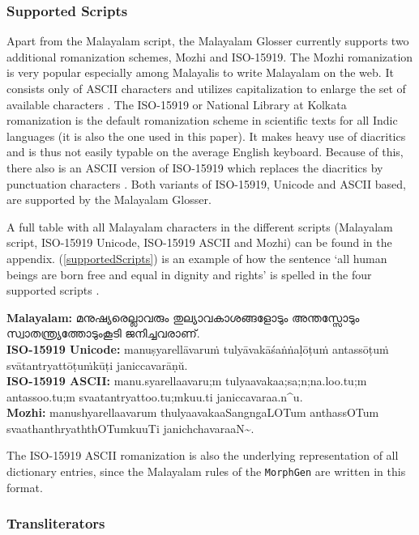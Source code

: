 \documentclass[a4paper]{article}
\newcommand{\typ}[1]{\texttt{#1}}
\begin{document}
\subsubsection{Supported Scripts}\label{scripts}

Apart from the Malayalam script, the Malayalam Glosser currently supports two additional romanization schemes, Mozhi and ISO-15919. The Mozhi romanization is very popular especially among Malayalis to write Malayalam on the web. It consists only of ASCII characters and utilizes capitalization to enlarge the set of available characters \parencite{mozhi}. The ISO-15919 or National Library at Kolkata romanization is the default romanization scheme in scientific texts for all Indic languages (it is also the one used in this paper). It makes heavy use of diacritics and is thus not easily typable on the average English keyboard. Because of this, there also is an ASCII version of ISO-15919 which replaces the diacritics by punctuation characters \parencite{iso-15919}. Both variants of ISO-15919, Unicode and ASCII based, are supported by the Malayalam Glosser.

A full table with all Malayalam characters in the different scripts (Malayalam script, ISO-15919 Unicode, ISO-15919 ASCII and Mozhi) can be found in the appendix. (\ref{supportedScripts}) is an example of how the sentence `all human beings are born free and equal in dignity and rights' is spelled in the four supported scripts \parencite{malOmniglot}.

\ex
\textbf{Malayalam:} മനുഷ്യരെല്ലാവരും തുല്യാവകാശങ്ങളോടും അന്തസ്സോടും സ്വാ\-ത\-ന്ത്ര്യ\-ത്തോ\-ടും\-കൂ\-ടി ജനിച്ചവരാണ്. \\[1ex]
\textbf{ISO-15919 Unicode:} manuṣyarellāvaruṁ tulyāvakāśaṅṅaḷōṭuṁ antassōṭ\-uṁ svātantryattōṭuṁkūṭi janiccavarāṇŭ. \\[1ex]
\textbf{ISO-15919 ASCII:} manu.syarellaavaru;m tulyaavakaa;sa;n;na.loo.tu;m antassoo.t\-u;m svaatantryattoo.tu;mkuu.ti janiccavaraa.n\^{}u. \\[1ex]
\textbf{Mozhi:} manushyarellaavarum thulyaavakaaSangngaLOTum anthassOT\-um svaathanthryaththOTumkuuTi janichchavaraaN\textasciitilde{}.
\label{supportedScripts}\xe

The ISO-15919 ASCII romanization is also the underlying representation of all dictionary entries, since the Malayalam rules of the \typ{MorphGen} are written in this format.

\subsubsection{Transliterators}
\end{document}
